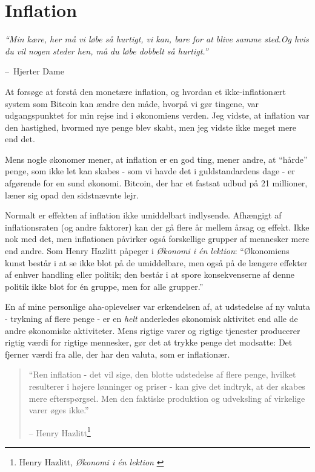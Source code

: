 \documentclass[paper=6in:9in,pagesize=pdftex,
               headinclude=on,footinclude=on,12pt]{scrbook}
\makeatletter
\newenvironment{chapquote}[2][4em]{\setlength{\@tempdima}{#1}%
   \def\chapquote@author{#2}%
   \parshape 1 \@tempdima \dimexpr\textwidth-2\@tempdima\relax%
   \itshape}{\par\normalfont\hfill--\ \chapquote@author\hspace*{\@tempdima}\par\bigskip}
\makeatother
\begin{document}
\chapter{Inflation}
\label{les:9}

\begin{chapquote}{Hjerter Dame} \enquote{Min kære, her må vi løbe så hurtigt, vi kan, bare for at blive samme sted.\newline Og hvis du vil nogen steder hen, må du løbe dobbelt så hurtigt.} \end{chapquote}

At forsøge at forstå den monetære inflation, og hvordan et ikke-inflationært system som Bitcoin kan ændre den måde, hvorpå vi gør tingene, var udgangspunktet for min rejse ind i økonomiens verden. Jeg vidste, at inflation var den hastighed, hvormed nye penge blev skabt, men jeg vidste ikke meget mere end det.

Mens nogle økonomer mener, at inflation er en god ting, mener andre, at \enquote{hårde} penge, som ikke let kan skabes - som vi havde det i guldstandardens dage - er afgørende for en sund økonomi. Bitcoin, der har et fastsat udbud på 21 millioner, læner sig opad den sidstnævnte lejr.

Normalt er effekten af inflation ikke umiddelbart indlysende. Afhængigt af inflationsraten (og andre faktorer) kan der gå flere år mellem årsag og effekt. Ikke nok med det, men inflationen påvirker også forskellige grupper af mennesker mere end andre. Som Henry Hazlitt påpeger i \textit{Økonomi i \'en lektion}: \enquote{Økonomiens kunst består i at se ikke blot på de umiddelbare, men også på de længere effekter af enhver handling eller politik; den består i at spore konsekvenserne af denne politik ikke blot for \'en gruppe, men for alle grupper.}

En af mine personlige aha-oplevelser var erkendelsen af, at udstedelse af ny valuta - trykning af flere penge - er en \textit{helt} anderledes økonomisk aktivitet end alle de andre økonomiske aktiviteter. Mens rigtige varer og rigtige tjenester producerer rigtig værdi for rigtige mennesker, gør det at trykke penge det modsatte: Det fjerner værdi fra alle, der har den valuta, som er inflationær.\begin{quotation}\begin{samepage} \enquote{Ren inflation - det vil sige, den blotte udstedelse af flere penge, hvilket resulterer i højere lønninger og priser - kan give det indtryk, at der skabes mere efterspørgsel. Men den faktiske produktion og udveksling af virkelige varer øges ikke.} \begin{flushright} -- Henry Hazlitt\footnote{Henry Hazlitt, \textit{Økonomi i \'en lektion} \cite{hazlitt}}
\end{flushright}\end{samepage}\end{quotation}
\end{document}
